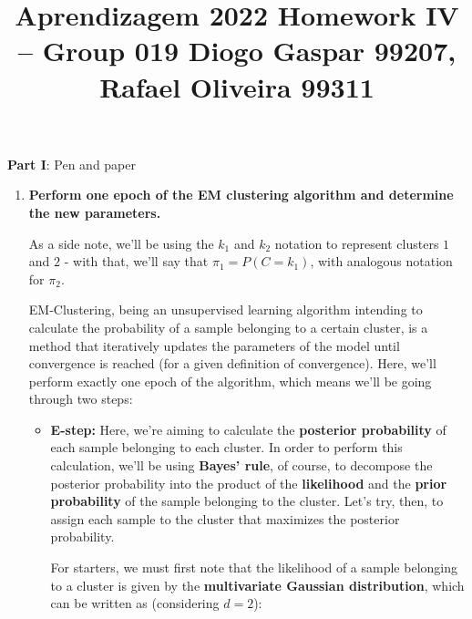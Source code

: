 \documentclass[12pt]{article}
\title{\large{Aprendizagem 2022}\vskip 0.2cm Homework IV -- Group 019\vskip 0.2cm Diogo Gaspar 99207, Rafael Oliveira 99311}
\date{}
\begin{document}
\maketitle
\center\large{\vskip -2.5cm\textbf{Part I}: Pen and paper}
\begin{enumerate}[leftmargin=\labelsep]

  Given the bivariate observations $\left\{ , ,  \right\}$,
  and the following multivariate Gaussian mixture:

  \begin{equation*}
    \mu_1 = , \quad \mu_2 = ,
    \quad \Sigma_1 = , \quad \Sigma_2 = ,
    \quad \pi_1 = \pi_2 = 0.5
  \end{equation*}

  \item \textbf{Perform one epoch of the EM clustering algorithm and determine the new parameters.}

        As a side note, we'll be using the $k_1$ and $k_2$ notation to represent
        clusters $1$ and $2$ - with that, we'll say that $\pi_1 = P(C = k_1)$,
        with analogous notation for $\pi_2$.

        EM-Clustering, being an unsupervised learning algorithm intending to calculate
        the probability of a sample belonging to a certain cluster, is a method that
        iteratively updates the parameters of the model until convergence is reached
        (for a given definition of convergence). Here, we'll perform exactly one
        epoch of the algorithm, which means we'll be going through two steps:

        \begin{itemize}[leftmargin=]
          \item \textbf{E-step:} Here, we're aiming to calculate the \textbf{posterior
                  probability} of each sample belonging to each cluster.
                In order to perform this calculation, we'll be using \textbf{Bayes' rule},
                of course, to decompose the posterior probability into the product of
                the \textbf{likelihood} and the \textbf{prior probability} of the sample
                belonging to the cluster. Let's try, then, to assign each sample to
                the cluster that maximizes the posterior probability.

                For starters, we must first note that the likelihood of a sample
                belonging to a cluster is given by the \textbf{multivariate Gaussian
                  distribution}, which can be written as (considering $d = 2$):


\end{itemize}
\end{enumerate}
\end{document}
